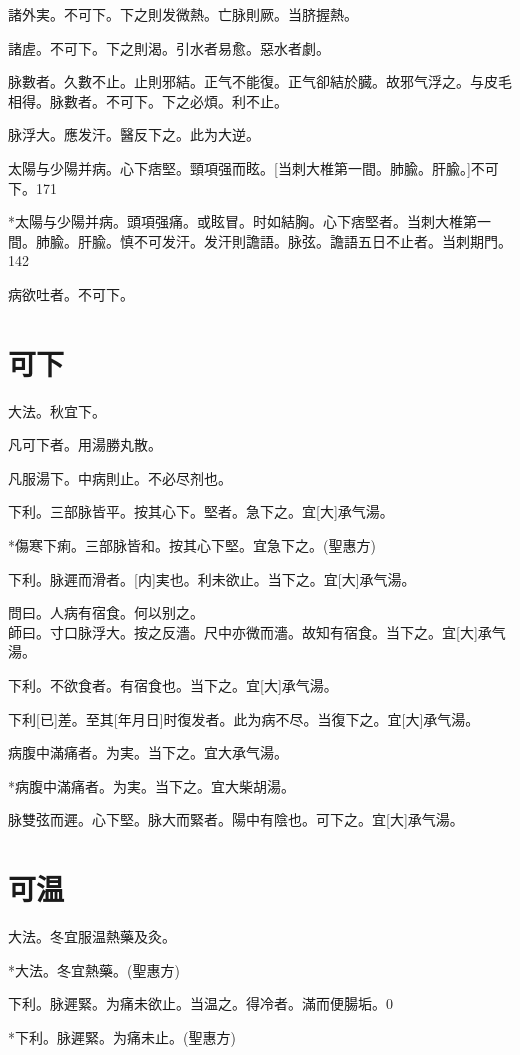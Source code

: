 \documentclass[12pt,twoside,UTF8,b5paper]{ctexbook}
\begin{document}
諸外実。不可下。下之則发微熱。亡脉則厥。当脐握熱。

諸虗。不可下。下之則渴。引水者易愈。惡水者劇。

脉數者。久數不止。止則邪結。正气不能復。正气卻結於臓。故邪气浮之。与皮毛相得。脉數者。不可下。下之必煩。利不止。

脉浮大。應发汗。醫反下之。此为大逆。

太陽与少陽并病。心下痞堅。頸項强而眩。[当刺大椎第一間。肺腧。肝腧。]不可下。171

*太陽与少陽并病。頭項强痛。或眩冒。时如結胸。心下痞堅者。当刺大椎第一間。肺腧。肝腧。慎不可发汗。发汗則譫語。脉弦。譫語五日不止者。当刺期門。142

病欲吐者。不可下。

\chapter{可下}

大法。秋宜下。

凡可下者。用湯勝丸散。

凡服湯下。中病則止。不必尽剂也。

下利。三部脉皆平。按其心下。堅者。急下之。宜[大]承气湯。

*傷寒下痢。三部脉皆和。按其心下堅。宜急下之。(聖惠方)

下利。脉遲而滑者。[内]実也。利未欲止。当下之。宜[大]承气湯。

問曰。人病有宿食。何以别之。\\
師曰。寸口脉浮大。按之反濇。尺中亦微而濇。故知有宿食。当下之。宜[大]承气湯。

下利。不欲食者。有宿食也。当下之。宜[大]承气湯。

下利[已]差。至其[年月日]时復发者。此为病不尽。当復下之。宜[大]承气湯。

病腹中滿痛者。为実。当下之。宜大承气湯。

*病腹中滿痛者。为実。当下之。宜大柴胡湯。

脉雙弦而遲。心下堅。脉大而緊者。陽中有陰也。可下之。宜[大]承气湯。

\chapter{可温}

大法。冬宜服温熱藥及灸。

*大法。冬宜熱藥。(聖惠方)

下利。脉遲緊。为痛未欲止。当温之。得冷者。滿而便腸垢。0

*下利。脉遲緊。为痛未止。(聖惠方)
\end{document}
